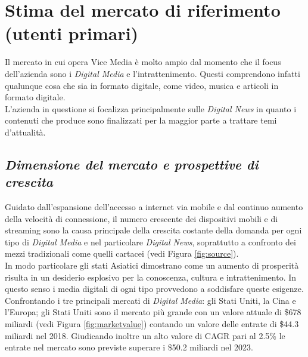 \documentclass[a4paper, 11pt]{article}
\begin{document}
\section*{Stima del mercato di riferimento (utenti primari)}
\par Il mercato in cui opera Vice Media è molto ampio dal momento che il focus dell'azienda sono i \textit{Digital Media} e l'intrattenimento. 
Questi comprendono infatti qualunque cosa che sia in formato digitale, come video, musica e articoli in formato digitale.\\
L'azienda in questione si focalizza principalmente sulle \textit{Digital News} in quanto i contenuti che produce sono finalizzati per la maggior parte a trattare temi d'attualità.

\subsection*{\textit{Dimensione del mercato e prospettive di crescita}}
\par Guidato dall’espansione dell’accesso a internet via mobile e dal continuo aumento della velocità di connessione, il numero crescente dei dispositivi mobili e di streaming sono la causa principale della crescita costante della domanda per ogni tipo di \textit{Digital Media} e nel particolare \textit{Digital News}, soprattutto a confronto dei mezzi tradizionali come quelli cartacei (vedi Figura \ref{fig:source}).\\ 
In modo particolare gli stati Asiatici dimostrano come un aumento di prosperità risulta in un desiderio esplosivo per la conoscenza, cultura e intrattenimento. In questo senso i media digitali di ogni tipo provvedono a soddisfare queste esigenze.\\
Confrontando i tre principali mercati di \textit{Digital Media}: gli Stati Uniti, la Cina e l’Europa; gli Stati Uniti sono il mercato più grande con un valore attuale di \$678 miliardi (vedi Figura \ref{fig:marketvalue}) contando un valore delle entrate di \$44.3 miliardi nel 2018.
Giudicando inoltre un alto valore di CAGR pari al 2.5\% le entrate nel mercato sono previste superare i \$50.2 miliardi nel 2023.\cite{Statista}
\end{document}
